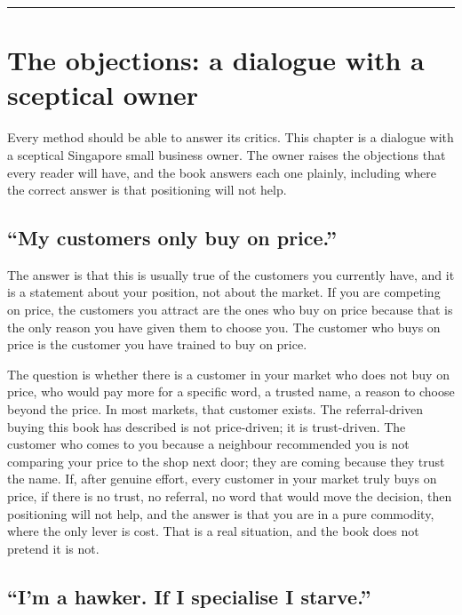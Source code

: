 \documentclass[10pt,twoside,openany]{memoir}
\newcommand{\needspacehead}{\needspace{4\baselineskip}}
\let\oldsection\section
\renewcommand{\section}{\needspacehead\oldsection}
\begin{document}
{{\begin{center}\rule{0.5\linewidth}{0.5pt}\end{center}

\FloatBarrier
\chapter{The objections: a dialogue with a sceptical
owner}\label{the-objections-a-dialogue-with-a-sceptical-owner}

Every method should be able to answer its critics. This chapter is a
dialogue with a sceptical Singapore small business owner. The owner
raises the objections that every reader will have, and the book answers
each one plainly, including where the correct answer is that positioning
will not help.

\section{``My customers only buy on
price.''}\label{my-customers-only-buy-on-price.}

The answer is that this is usually true of the customers you currently
have, and it is a statement about your position, not about the market.
If you are competing on price, the customers you attract are the ones
who buy on price because that is the only reason you have given them to
choose you. The customer who buys on price is the customer you have
trained to buy on price.

The question is whether there is a customer in your market who does not
buy on price, who would pay more for a specific word, a trusted name, a
reason to choose beyond the price. In most markets, that customer
exists. The referral-driven buying this book has described is not
price-driven; it is trust-driven. The customer who comes to you because
a neighbour recommended you is not comparing your price to the shop next
door; they are coming because they trust the name. If, after genuine
effort, every customer in your market truly buys on price, if there is
no trust, no referral, no word that would move the decision, then
positioning will not help, and the answer is that you are in a pure
commodity, where the only lever is cost. That is a real situation, and
the book does not pretend it is not.

\section{``I'm a hawker. If I specialise I
starve.''}\label{im-a-hawker.-if-i-specialise-i-starve.}

}}
\end{document}
